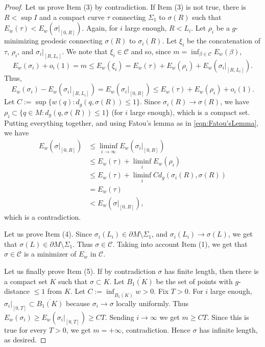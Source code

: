 \documentclass[12pt,a4paper,reqno]{amsart}
\theoremstyle{definition}
\renewcommand{\leq}{\leqslant}
\renewcommand{\geq}{\geqslant}
\begin{document}
{{\begin{proof}
Let us prove Item (3) by contradiction.
If Item (3) is not true, there is $R<\sup I$ and a compact curve $\tau$ connecting $\Sigma_1$ to $\sigma(R)$ such that $E_w(\tau)<E_{w}(\sigma|_{[0,R]})$. Again, for $i$ large enough, $R<L_i$. Let $\rho_i$ be a $g$-minimizing geodesic connecting $\sigma(R)$ to $\sigma_{i}(R)$. Let $\xi_i$ be the concatenation of $\tau$, $\rho_i$, and $\sigma_{i}|_{[R,L_i]}$. We note that $\xi_i\in \mathcal{C}$ and so, since $m=\inf_{\beta\in \mathcal{C}} E_w(\beta)$,
\[
E_w(\sigma_i)+o_i(1)=m \leq E_{w}(\xi_i) = E_{w}(\tau)+E_{w}(\rho_i)+E_{w}(\sigma_{i}|_{[R,L_i]}).
\]
Thus,
\[
E_{w}(\sigma_i) - E_{w}(\sigma_{i}|_{[R,L_i]}) = E_{w}(\sigma_{i}|_{[0,R]})\leq E_{w}(\tau)+E_{w}(\rho_i)+o_i(1).
\]
Let $C:=\sup\{w(q):d_g(q,\sigma(R))\leq 1\}$. Since $\sigma_{i}(R)\to \sigma(R)$, we have $\rho_i \subset \{q\in M: d_g(q,\sigma(R)) \leq 1\}$ (for $i$ large enough), which is a compact set.
Putting everything together, and using Fatou's lemma as in \eqref{eqn:Fatou'sLemma}, we have
\begin{align*}
     E_{w}(\sigma|_{[0,R]})&\leq \liminf_{i\to\infty}E_{w}(\sigma_{i} | _{[0,R]})\\
     &\leq E_{w}(\tau)+ \liminf_{i}E_{w}(\rho_i)\\
     & \leq E_{w}(\tau) + \liminf_{i} Cd_g(\sigma_{i}(R),\sigma(R))\\
     &=E_{w}(\tau)\\
     &< E_{w}(\sigma|_{[0,R]}),
\end{align*}
which is a contradiction.
\smallskip

Let us prove Item (4).  Since $\sigma_i(L_i)\in\partial M\setminus\Sigma_1$, and $\sigma_i(L_i)\to\sigma(L)$, we get that $\sigma(L)\in\partial M\setminus\Sigma_1$. Thus $\sigma\in\mathcal{C}$. Taking into account Item (1), we get that $\sigma\in\mathcal{C}$ is a minimizer of $E_w$ in $\mathcal{C}$.
\smallskip 

Let us finally prove Item (5). If by contradiction $\sigma$ has finite length, then there is a compact set $K$ such that $\sigma\subset K$. Let $\overline{B_1(K)}$ be the set of points with $g$-distance $\leq 1$ from $K$.  Let $C:=\inf_{\overline{B_1(K)}} w>0$. Fix $T>0$. For $i$ large enough, $\sigma_i|_{[0,T]}\subset \overline{B_1(K)}$ because $\sigma_i\to \sigma$ locally uniformly. Thus $E_w(\sigma_i)\geq E_w(\sigma_i|_{[0,T]})\geq CT$. Sending $i\to\infty$ we get $m\geq CT$. Since this is true for every $T>0$, we get $m=+\infty$, contradiction. Hence $\sigma$ has infinite length, as desired.
\end{proof}

}}
\end{document}

